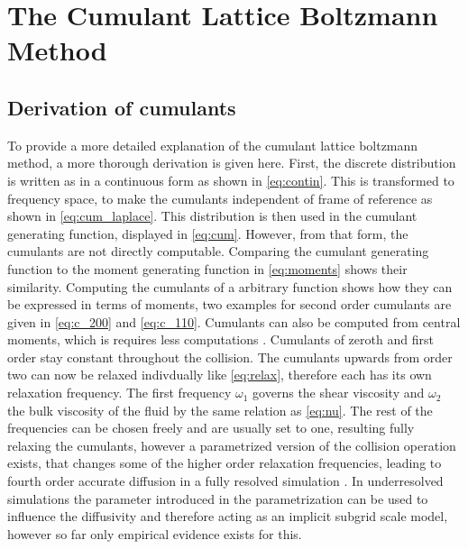 \chapter{The Cumulant Lattice Boltzmann Method}
\label{app:cumulant}
\section{Derivation of cumulants}
To provide a more detailed explanation of the cumulant lattice boltzmann method, a more thorough derivation is given here. First, the discrete distribution is written as in a continuous form as shown in \eqref{eq:contin}. This is transformed to frequency space, to make the cumulants independent of frame of reference as shown in \eqref{eq:cum_laplace}. This distribution is then used in the cumulant generating function, displayed in \eqref{eq:cum}. However, from that form, the cumulants are not directly computable. Comparing the cumulant generating function to the moment generating function in \eqref{eq:moments} shows their similarity. Computing the cumulants of a arbitrary function shows how they can be expressed in terms of moments, two examples for second order cumulants are given in \eqref{eq:c_200} and \eqref{eq:c_110}. Cumulants can also be computed from central moments, which is requires less computations \cite{geier_cumulant_2015}. Cumulants of zeroth and first order stay constant throughout the collision. The cumulants upwards from order two can now be relaxed indivdually like \eqref{eq:relax}, therefore each has its own relaxation frequency. The first frequency $\omega_1$ governs the shear viscosity and $\omega_2$ the bulk viscosity of the fluid by the same relation as \eqref{eq:nu}. The rest of the frequencies can be chosen freely and are usually set to one, resulting fully relaxing the cumulants, however a parametrized version of the collision operation exists, that changes some of the higher order relaxation frequencies, leading to fourth order accurate diffusion in a fully resolved simulation \cite{geier_parametrization_2017}. In underresolved simulations the parameter introduced in the parametrization can be used to influence the diffusivity and therefore acting as an implicit subgrid scale model, however so far only empirical evidence exists for this.\cite{geier_cumulant_2015} 
